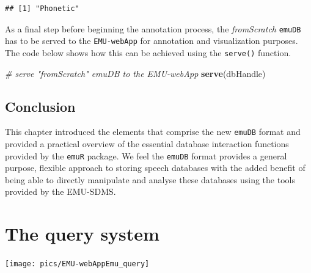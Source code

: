 \documentclass[]{book}
\newenvironment{Shaded}{\begin{snugshade}}{\end{snugshade}}
\newcommand{\CommentTok}[1]{\textcolor[rgb]{0.56,0.35,0.01}{\textit{#1}}}
\newcommand{\KeywordTok}[1]{\textcolor[rgb]{0.13,0.29,0.53}{\textbf{#1}}}
\newcommand{\NormalTok}[1]{#1}
\begin{document}
\begin{verbatim}
## [1] "Phonetic"
\end{verbatim}

As a final step before beginning the annotation process, the \emph{fromScratch} \texttt{emuDB} has to be served to the \texttt{EMU-webApp} for annotation and visualization purposes. The code below shows how this can be achieved using the \texttt{serve()} function.

\begin{Shaded}
\begin{Highlighting}[]
\CommentTok{# serve "fromScratch" emuDB to the EMU-webApp}
\KeywordTok{serve}\NormalTok{(dbHandle)}
\end{Highlighting}
\end{Shaded}

\hypertarget{conclusion-2}{%
\section{Conclusion}\label{conclusion-2}}

This chapter introduced the elements that comprise the new \texttt{emuDB} format and provided a practical overview of the essential database interaction functions provided by the \texttt{emuR} package. We feel the \texttt{emuDB} format provides a general purpose, flexible approach to storing speech databases with the added benefit of being able to directly manipulate and analyse these databases using the tools provided by the EMU-SDMS.

\hypertarget{chap:querysys}{%
\chapter{The query system}\label{chap:querysys}}

\begin{center}\texttt{[image: pics/EMU-webAppEmu\_query]} \end{center}
\end{document}
